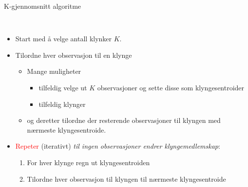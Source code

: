 \documentclass[10pt,ignorenonframetext,]{beamer}
\providecommand{\tightlist}{%
  \setlength{\itemsep}{0pt}\setlength{\parskip}{0pt}}
\begin{document}
\begin{frame}

\begin{block}{K-gjennomsnitt algoritme}

\(~\)

\begin{itemize}
\tightlist
\item
  Start med å velge antall klynker \(K\).
\end{itemize}

\vspace{2mm}

\begin{itemize}
\item
  Tilordne hver observasjon til en klynge

  \begin{itemize}
  \tightlist
  \item
    Mange muligheter

    \begin{itemize}
    \tightlist
    \item
      tilfeldig velge ut \(K\) observasjoner og sette disse som
      klyngesentroider
    \item
      tilfeldig klynger
    \end{itemize}
  \item
    og deretter tilordne der resterende observasjoner til klyngen med
    nærmeste klyngesentroide.
  \end{itemize}
\end{itemize}

\vspace{2mm}

\begin{itemize}
\tightlist
\item
  \textcolor{red}{Repeter} (iterativt) \emph{til ingen observasjoner
  endrer klyngemedlemskap}:

  \begin{enumerate}
  \tightlist
  \item
    For hver klynge regn ut klyngesentroiden
  \item
    Tilordne hver observasjon til klyngen til nærmeste klyngesentroide
  \end{enumerate}
\end{itemize}

\end{block}

\end{frame}
\end{document}
